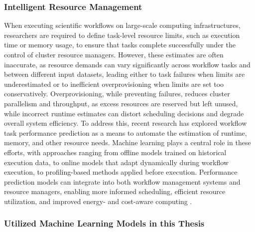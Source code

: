 \subsubsection{Intelligent Resource Management}
\label{sec:background_ml_resourcemanagement}
When executing scientific workflows on large-scale computing infrastructures, researchers are required to define task-level resource limits, such as execution time or memory usage, to ensure that tasks complete successfully under the control of cluster resource managers. However, these estimates are often inaccurate, as resource demands can vary significantly across workflow tasks and between different input datasets, leading either to task failures when limits are underestimated or to inefficient overprovisioning when limits are set too conservatively. Overprovisioning, while preventing failures, reduces cluster parallelism and throughput, as excess resources are reserved but left unused, while incorrect runtime estimates can distort scheduling decisions and degrade overall system efficiency. To address this, recent research has explored workflow task performance prediction as a means to automate the estimation of runtime, memory, and other resource needs. Machine learning plays a central role in these efforts, with approaches ranging from offline models trained on historical execution data, to online models that adapt dynamically during workflow execution, to profiling-based methods applied before execution. Performance prediction models can integrate into both workflow management systems and resource managers, enabling more informed scheduling, efficient resource utilization, and improved energy- and cost-aware computing \cite{bader2025predictingperformancescientificworkflows}  \cite{ZACARIAS2021125}.

\subsubsection{Utilized Machine Learning Models in this Thesis}
\label{sec:background_ml_algorithms}

